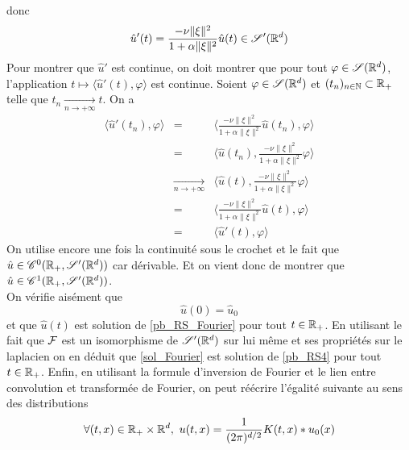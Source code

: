donc 
\begin{equation*}
    \hat{u}'(t) = \frac{-\nu\|\xi\|^2}{1+\alpha\|\xi\|^2}\hat{u}(t) \in \mathscr{S}'(\mathbb{R}^d)
\end{equation*}
Pour montrer que $\hat{u}'$ est continue, on doit montrer que pour tout $\varphi \in \mathscr{S}(\mathbb{R}^d)$, l'application $t \mapsto \langle \hat{u}'(t),\varphi\rangle$ est continue. Soient $\varphi \in \mathscr{S}(\mathbb{R}^d)$ et $(t_n)_{n \in \mathbb{N}} \subset \mathbb{R}_+$ telle que $t_n \underset{n \to+\infty}{\longrightarrow} t$. On a 
\begin{eqnarray*}
    \langle \hat{u}'(t_n),\varphi\rangle &=& \Big\langle \frac{-\nu\|\xi\|^2}{1+\alpha\|\xi\|^2}\hat{u}(t_n), \varphi\Big\rangle \\
    &=& \Big\langle \hat{u}(t_n), \frac{-\nu\|\xi\|^2}{1+\alpha\|\xi\|^2}\varphi\Big\rangle \\
    &\underset{n \to +\infty}{\longrightarrow}& \Big\langle \hat{u}(t), \frac{-\nu\|\xi\|^2}{1+\alpha\|\xi\|^2}\varphi\Big\rangle \\
    &=& \Big\langle \frac{-\nu\|\xi\|^2}{1+\alpha\|\xi\|^2}\hat{u}(t), \varphi\Big\rangle \\
    &=& \langle \hat{u}'(t),\varphi \rangle
\end{eqnarray*}
On utilise encore une fois la continuité sous le crochet et le fait que $\hat{u} \in \mathscr{C}^0(\mathbb{R}_+,\mathscr{S}'(\mathbb{R}^d))$ car dérivable. Et on vient donc de montrer que $\hat{u} \in \mathscr{C}^1(\mathbb{R}_+,\mathscr{S}'(\mathbb{R}^d))$.
\\
On vérifie aisément que 
\begin{equation*}
    \hat{u}(0)=\hat{u}_0
\end{equation*}
et que $\hat{u}(t)$ est solution de \eqref{pb_RS_Fourier} pour tout $t \in \mathbb{R}_+$. En utilisant le fait que $\mathcal{F}$ est un isomorphisme de $\mathscr{S}'(\mathbb{R}^d)$ sur lui même et ses propriétés sur le laplacien on en déduit que \eqref{sol_Fourier} est solution de \eqref{pb_RS4} pour tout $t \in \mathbb{R}_+$. Enfin, en utilisant la formule d'inversion de Fourier et le lien entre convolution et transformée de Fourier, on peut réécrire l'égalité suivante au sens des distributions
\begin{eqnarray}\label{sol_S'}
    \forall (t,x) \in \mathbb{R}_+\times \mathbb{R}^d, \ u(t,x) = \frac{1}{(2\pi)^{d/2}}K(t,x)*u_0(x)
\end{eqnarray}

